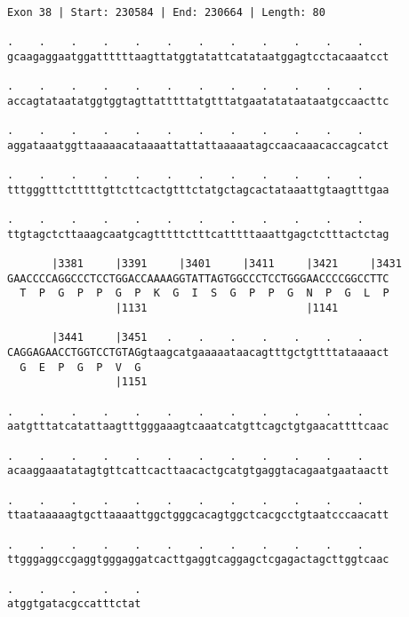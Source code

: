 \documentclass{article}
\begin{document}
\begin{Verbatim}
Exon 38 | Start: 230584 | End: 230664 | Length: 80
 
.    .    .    .    .    .    .    .    .    .    .    .    
gcaagaggaatggattttttaagttatggtatattcatataatggagtcctacaaatcct
  
.    .    .    .    .    .    .    .    .    .    .    .    
accagtataatatggtggtagttatttttatgtttatgaatatataataatgccaacttc
  
.    .    .    .    .    .    .    .    .    .    .    .    
aggataaatggttaaaaacataaaattattattaaaaatagccaacaaacaccagcatct
  
.    .    .    .    .    .    .    .    .    .    .    .    
tttgggtttctttttgttcttcactgtttctatgctagcactataaattgtaagtttgaa
  
.    .    .    .    .    .    .    .    .    .    .    .    
ttgtagctcttaaagcaatgcagtttttctttcatttttaaattgagctctttactctag
  
       |3381     |3391     |3401     |3411     |3421     |3431
GAACCCCAGGCCCTCCTGGACCAAAAGGTATTAGTGGCCCTCCTGGGAACCCCGGCCTTC
  T  P  G  P  P  G  P  K  G  I  S  G  P  P  G  N  P  G  L  P
                 |1131                         |1141        
  
       |3441     |3451   .    .    .    .    .    .    .    
CAGGAGAACCTGGTCCTGTAGgtaagcatgaaaaataacagtttgctgttttataaaact
  G  E  P  G  P  V  G                                       
                 |1151                                      
  
.    .    .    .    .    .    .    .    .    .    .    .    
aatgtttatcatattaagtttgggaaagtcaaatcatgttcagctgtgaacattttcaac
  
.    .    .    .    .    .    .    .    .    .    .    .    
acaaggaaatatagtgttcattcacttaacactgcatgtgaggtacagaatgaataactt
  
.    .    .    .    .    .    .    .    .    .    .    .    
ttaataaaaagtgcttaaaattggctgggcacagtggctcacgcctgtaatcccaacatt
  
.    .    .    .    .    .    .    .    .    .    .    .    
ttgggaggccgaggtgggaggatcacttgaggtcaggagctcgagactagcttggtcaac
  
.    .    .    .    .
atggtgatacgccatttctat
\end{Verbatim}
\newpage
\end{document}
